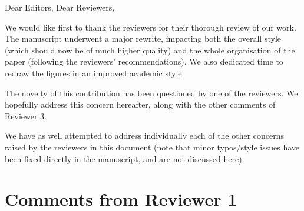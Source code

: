 \documentclass{article}
\begin{document}
Dear Editors, Dear Reviewers,

\vspace{2em}

We would like first to thank the reviewers for their thorough review of our
work. The manuscript underwent a major rewrite, impacting both the overall style
(which should now be of much higher quality) and the whole organisation of
the paper (following the reviewers' recommendations). We also dedicated time to
redraw the figures in an improved academic style.

The novelty of this contribution has been questioned by one of the reviewers.
We hopefully address this concern hereafter, along with the other comments of
Reviewer 3.

We have as well attempted to address individually each of the other concerns
raised by the reviewers in this document (note that minor typos/style issues
have been fixed directly in the manuscript, and are not discussed here).


\section{Comments from Reviewer 1}
\end{document}

